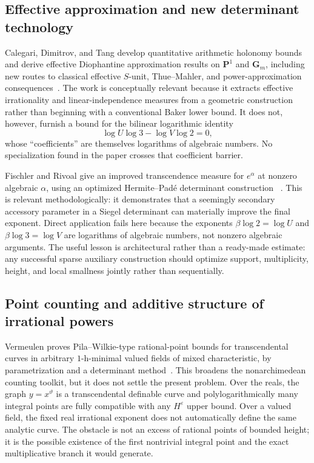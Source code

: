 \documentclass[11pt,oneside]{article}
\theoremstyle{definition}
\theoremstyle{remark}
\newcommand{\thetaq}{\vartheta}
\begin{document}
\subsection{Effective approximation and new determinant technology}

Calegari, Dimitrov, and Tang develop quantitative arithmetic holonomy bounds and derive
effective Diophantine approximation results on $\mathbf P^1$ and $\mathbf G_m$, including
new routes to classical effective $S$-unit, Thue--Mahler, and power-approximation
consequences~\cite{CalegariDimitrovTang2025}.  The work is conceptually relevant because it
extracts effective irrationality and linear-independence measures from a geometric
construction rather than beginning with a conventional Baker lower bound.  It does not,
however, furnish a bound for the bilinear logarithmic identity
\[
 \log U\log3-\log V\log2=0,
\]
whose ``coefficients'' are themselves logarithms of algebraic numbers.  No specialization
found in the paper crosses that coefficient barrier.

Fischler and Rivoal give an improved transcendence measure for $e^\alpha$ at nonzero
algebraic $\alpha$, using an optimized Hermite--Pad\'e determinant construction
~\cite{FischlerRivoal2025}.  This is relevant methodologically: it demonstrates that a
seemingly secondary accessory parameter in a Siegel determinant can materially improve the
final exponent.  Direct application fails here because the exponents
$\beta\log2=\log U$ and $\beta\log3=\log V$ are logarithms of algebraic numbers, not nonzero
algebraic arguments.  The useful lesson is architectural rather than a ready-made estimate:
any successful sparse auxiliary construction should optimize support, multiplicity, height,
and local smallness jointly rather than sequentially.

\subsection{Point counting and additive structure of irrational powers}

Vermeulen proves Pila--Wilkie-type rational-point bounds for transcendental curves in
arbitrary $1$-h-minimal valued fields of mixed characteristic, by parametrization and a
determinant method~\cite{Vermeulen2025}.  This broadens the nonarchimedean counting toolkit,
but it does not settle the present problem.  Over the reals, the graph $y=x^{\thetaq}$ is a
transcendental definable curve and polylogarithmically many integral points are fully
compatible with any $H^\varepsilon$ upper bound.  Over a valued field, the fixed real
irrational exponent does not automatically define the same analytic curve.  The obstacle is
not an excess of rational points of bounded height; it is the possible existence of the first
nontrivial integral point and the exact multiplicative branch it would generate.
\end{document}
